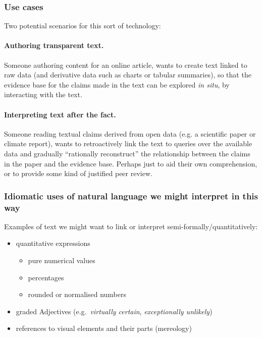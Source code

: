 \subsubsection{Use cases}
Two potential scenarios for this sort of technology:

\paragraph{Authoring transparent text.} Someone authoring content for an online article, wants to create text
linked to raw data (and derivative data such as charts or tabular summaries), so that the evidence base for
the claims made in the text can be explored \emph{in situ}, by interacting with the text.

\paragraph{Interpreting text after the fact.} Someone reading textual claims derived from open data (e.g. a
scientific paper or climate report), wants to retroactively link the text to queries over the available data
and gradually ``rationally reconstruct'' the relationship between the claims in the paper and the evidence
base. Perhaps just to aid their own comprehension, or to provide some kind of justified peer review.

\subsubsection{Idiomatic uses of natural language we might interpret in this way}

Examples of text we might want to link or interpret semi-formally/quantitatively:

\begin{itemize}
\item quantitative expressions
\begin{itemize}
   \item pure numerical values
   \item percentages
   \item rounded or normalised numbers
\end{itemize}
\item graded Adjectives (e.g.~\emph{virtually certain}, \emph{exceptionally unlikely})
\item references to visual elements and their parts (mereology)
\end{itemize}
